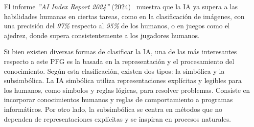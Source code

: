 El informe \textit{''AI Index Report 2024''} (2024)~\cite{aiindex2024} muestra que la IA ya supera a las habilidades humanas en ciertas tareas, como en la clasificación de imágenes, con una precisión del \textit{97\%} respecto al \textit{95\%} de los humanos, o en juegos como el ajedrez, donde supera consistentemente a los jugadores humanos.

Si bien existen diversas formas de clasificar la IA, una de las más interesantes respecto a este PFG es la basada en la representación y el procesamiento del conocimiento. Según esta clasificación, existen dos tipos: la simbólica y la subsimbólica. La IA simbólica utiliza representaciones explícitas y legibles para los humanos, como símbolos y reglas lógicas, para resolver problemas. Consiste en incorporar conocimientos humanos y reglas de comportamiento a programas informáticos. Por otro lado, la subsimbólica se centra en métodos que no dependen de representaciones explícitas y se inspiran en procesos naturales.

